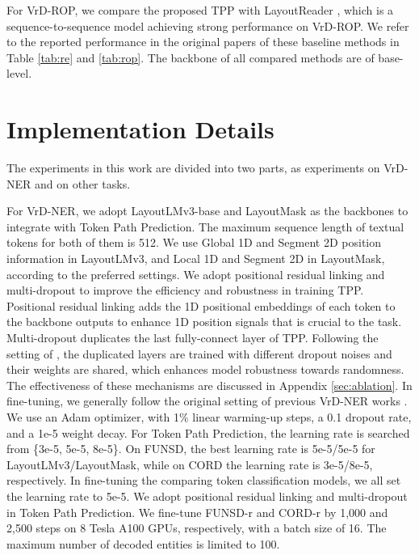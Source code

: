 \documentclass[11pt]{article}
\begin{document}
\noindent For VrD-ROP, we compare the proposed TPP with LayoutReader \citep{wang2021layoutreader}, which is a sequence-to-sequence model achieving strong performance on VrD-ROP. 
We refer to the reported performance in the original papers of these baseline methods in Table \ref{tab:re} and \ref{tab:rop}. The backbone of all compared methods are of base-level. 


\section{Implementation Details}
\label{sec:implementation_detail}


The experiments in this work are divided into two parts, as experiments on VrD-NER and on other tasks.

For VrD-NER, we adopt LayoutLMv3-base \citep{huang2022layoutlmv3} and LayoutMask \citep{tu2023layoutmask} as the backbones to integrate with Token Path Prediction. 
The maximum sequence length of textual tokens for both of them is 512.
We use Global 1D and Segment 2D position information in LayoutLMv3, and Local 1D and Segment 2D in LayoutMask, according to the preferred settings. 
We adopt positional residual linking and multi-dropout to improve the efficiency and robustness in training TPP. 
Positional residual linking adds the 1D positional embeddings of each token to the backbone outputs to enhance 1D position signals that is crucial to the task. 
Multi-dropout duplicates the last fully-connect layer of TPP. Following the setting of \citep{inoue2019multi}, the duplicated layers are trained with different dropout noises and their weights are shared, which enhances model robustness towards randomness. 
The effectiveness of these mechanisms are discussed in Appendix \ref{sec:ablation}. 
In fine-tuning, we generally follow the original setting of previous VrD-NER works \citep{huang2022layoutlmv3, tu2023layoutmask}. 
We use an Adam optimizer, with 1\% linear warming-up steps, a 0.1 dropout rate, and a 1e-5 weight decay. 
For Token Path Prediction, the learning rate is searched from \{3e-5, 5e-5, 8e-5\}.
On FUNSD, the best learning rate is 5e-5/5e-5 for LayoutLMv3/LayoutMask, while on CORD the learning rate is 3e-5/8e-5, respectively. 
In fine-tuning the comparing token classification models, we all set the learning rate to 5e-5. 
We adopt positional residual linking and multi-dropout in Token Path Prediction. We fine-tune FUNSD-r and CORD-r by 1,000 and 2,500 steps on 8 Tesla A100 GPUs, respectively, with a batch size of 16. 
The maximum number of decoded entities is limited to 100. 
\end{document}
